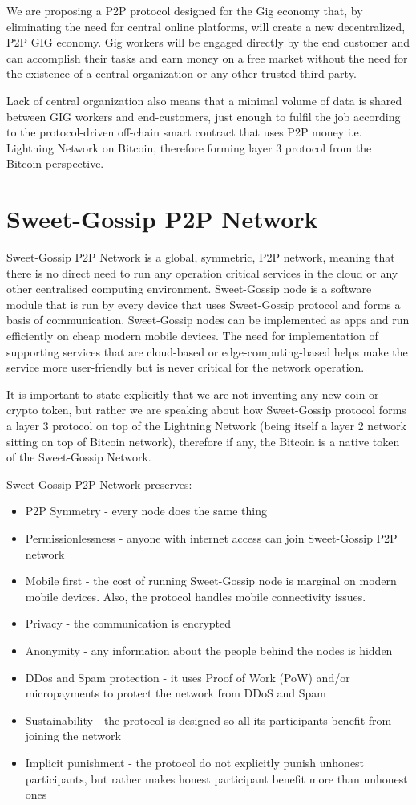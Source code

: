 \documentclass{article}
\begin{document}
We are proposing a P2P protocol designed for the Gig economy that, by eliminating the need for central online platforms, will create a new decentralized, P2P GIG economy. Gig workers will be engaged directly by the end customer and can accomplish their tasks and earn money on a free market without the need for the existence of a central organization or any other trusted third party.

Lack of central organization also means that a minimal volume of data is shared between GIG workers and end-customers, just enough to fulfil the job according to the protocol-driven off-chain smart contract that uses P2P money i.e. Lightning Network on Bitcoin, therefore forming layer 3 protocol from the Bitcoin perspective.

\section{Sweet-Gossip P2P Network}
Sweet-Gossip P2P Network is a global, symmetric, P2P network, meaning that there is no direct need to run any operation critical services in the cloud or any other centralised computing environment. Sweet-Gossip node is a software module that is run by every device that uses Sweet-Gossip protocol and forms a basis of communication. Sweet-Gossip nodes can be implemented as apps and run efficiently on cheap modern mobile devices. The need for implementation of supporting services that are cloud-based or edge-computing-based helps make the service more user-friendly but is never critical for the network operation.

It is important to state explicitly that we are not inventing any new coin or crypto token, but rather we are speaking about how Sweet-Gossip protocol forms a layer 3 protocol on top of the Lightning Network (being itself a layer 2 network sitting on top of Bitcoin network), therefore if any, the Bitcoin is a native token of the Sweet-Gossip Network.

Sweet-Gossip P2P Network preserves:

\begin{itemize}
\item P2P Symmetry - every node does the same thing
\item Permissionlessness - anyone with internet access can join Sweet-Gossip P2P network
\item Mobile first - the cost of running Sweet-Gossip node is marginal on modern mobile devices. Also, the protocol handles mobile connectivity issues.
\item Privacy - the communication is encrypted
\item Anonymity - any information about the people behind the nodes is hidden
\item DDos and Spam protection - it uses Proof of Work (PoW) and/or micropayments to protect the network from DDoS and Spam
\item Sustainability - the protocol is designed so all its participants benefit from joining the network
\item Implicit punishment - the protocol do not explicitly punish unhonest participants, but rather makes honest participant benefit more than unhonest ones
\end{itemize}
\end{document}
